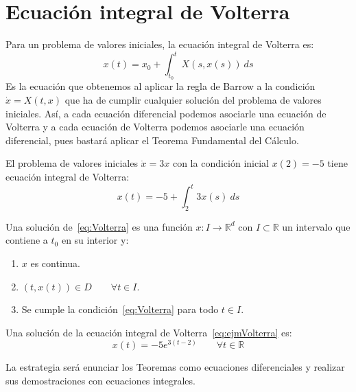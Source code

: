 \section{Ecuación integral de Volterra}
\noindent
Para un problema de valores iniciales, la ecuación integral de Volterra es:
\begin{equation}\label{eq:Volterra}
    x(t) = x_0 + \int_{t_0}^{t} X(s,x(s))~ds 
\end{equation}
Es la ecuación que obtenemos al aplicar la regla de Barrow a la condición $\dot{x} = X(t,x)$ que ha de cumplir cualquier solución del problema de valores iniciales. Así, a cada ecuación diferencial podemos asociarle una ecuación de Volterra y a cada ecuación de Volterra podemos asociarle una ecuación diferencial, pues bastará aplicar el Teorema Fundamental del Cálculo.

\begin{ejemplo}
    El problema de valores iniciales $\dot{x} = 3x$ con la condición inicial $x(2) = -5$ tiene ecuación integral de Volterra:
    \begin{equation}\label{eq:ejmVolterra}
        x(t) = -5 + \int_{2}^{t} 3x(s)~ds 
    \end{equation}
\end{ejemplo}

\begin{definicion}
    Una solución de~\eqref{eq:Volterra} es una función $x:I\to \mathbb{R}^d$ con $I\subset \mathbb{R}$ un intervalo que contiene a $t_0$ en su interior y:
    \begin{enumerate}
        \item[$i)$] $x$ es continua.
        \item[$ii)$] $(t,x(t)) \in D\qquad \forall t\in I$.
        \item[$iii)$] Se cumple la condición~\eqref{eq:Volterra} para todo $t\in I$.
    \end{enumerate}
\end{definicion}

\begin{ejemplo}
    Una solución de la ecuación integral de Volterra~\eqref{eq:ejmVolterra} es:
    \begin{equation*}
        x(t) = -5e^{3(t-2)} \qquad \forall t\in \mathbb{R}
    \end{equation*}
\end{ejemplo}

\noindent
La estrategia será enunciar los Teoremas como ecuaciones diferenciales y realizar sus demostraciones con ecuaciones integrales.

